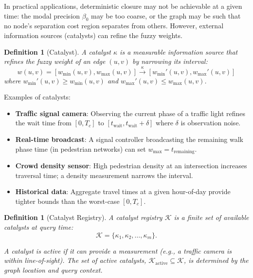 \documentclass[twocolumn,11pt,a4paper]{article}
\newtheorem{definition}[theorem]{Definition}
\theoremstyle{definition}
\begin{document}
In practical applications, deterministic closure may not be achievable at a given time: the modal precision $\beta_0$ may be too coarse, or the graph may be such that no node's separation cost region separates from others. However, external information sources (catalysts) can refine the fuzzy weights.

\begin{definition}[Catalyst]
\label{def:catalyst}
A catalyst $\kappa$ is a measurable information source that refines the fuzzy weight of an edge $(u, v)$ by narrowing its interval:
\begin{equation}
w(u, v) = [w_{\min}(u,v), w_{\max}(u,v)] \xrightarrow{\kappa} [w_{\min}'(u,v), w_{\max}'(u,v)]
\end{equation}
where $w_{\min}'(u,v) \geq w_{\min}(u,v)$ and $w_{\max}'(u,v) \leq w_{\max}(u,v)$.
\end{definition}

Examples of catalysts:
\begin{itemize}
\item \textbf{Traffic signal camera}: Observing the current phase of a traffic light refines the wait time from $[0, T_c]$ to $[t_{\text{wait}}, t_{\text{wait}} + \delta]$ where $\delta$ is observation noise.
\item \textbf{Real-time broadcast}: A signal controller broadcasting the remaining walk phase time (in pedestrian networks) can set $w_{\max} = t_{\text{remaining}}$.
\item \textbf{Crowd density sensor}: High pedestrian density at an intersection increases traversal time; a density measurement narrows the interval.
\item \textbf{Historical data}: Aggregate travel times at a given hour-of-day provide tighter bounds than the worst-case $[0, T_c]$.
\end{itemize}

\begin{definition}[Catalyst Registry]
\label{def:registry}
A catalyst registry $\mathcal{K}$ is a finite set of available catalysts at query time:
\begin{equation}
\mathcal{K} = \{\kappa_1, \kappa_2, \ldots, \kappa_m\}.
\end{equation}

A catalyst is \emph{active} if it can provide a measurement (e.g., a traffic camera is within line-of-sight). The set of active catalysts, $\mathcal{K}_{\text{active}} \subseteq \mathcal{K}$, is determined by the graph location and query context.
\end{definition}
\end{document}
